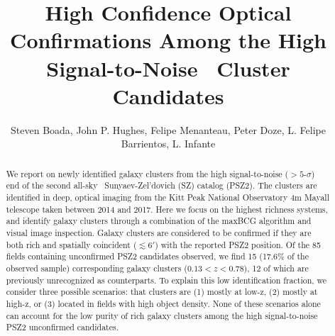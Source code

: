 \documentclass[apj, revtex4-1]{emulateapj}
\begin{document}
\title{High Confidence Optical Confirmations Among the High Signal-to-Noise \planck\ Cluster Candidates}

\author{\sc Steven Boada,
John P. Hughes,
Felipe Menanteau,
Peter Doze,
L. Felipe Barrientos,
L. Infante
}



\begin{abstract}
\noindent We report on newly identified galaxy clusters from the high signal-to-noise ($>5$-$\sigma$) end of the second all-sky \planck\ Sunyaev-Zel'dovich (SZ) catalog (PSZ2). The clusters are identified in deep, optical imaging from the Kitt Peak National Observatory 4m Mayall telescope taken between 2014 and 2017. Here we focus on the highest richness systems, and identify galaxy clusters through a combination of the maxBCG algorithm and visual image inspection. Galaxy clusters are considered to be confirmed if they are both rich and spatially coincident ($\lesssim 6'$) with the reported PSZ2 position. Of the 85 fields containing unconfirmed PSZ2 candidates observed, we find 15 (17.6\% of the observed sample) corresponding galaxy clusters ($ 0.13 < z < 0.78$), 12 of which are previously unrecognized as counterparts. To explain this low identification fraction, we consider three possible scenarios: that clusters are (1) mostly at low-z, (2) mostly at high-z, or (3) located in fields with high object density.  None of these scenarios alone can account for the low purity of rich galaxy clusters among the high signal-to-noise PSZ2 unconfirmed candidates.
\end{abstract}
\end{document}

